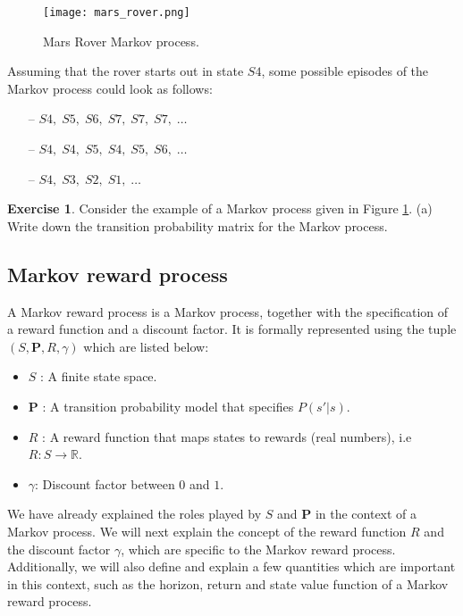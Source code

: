 \documentclass{article}
\theoremstyle{definition}
\newtheorem{exercise}{Exercise}[section]
\theoremstyle{remark}
\begin{document}
\begin{figure}[h]
    \centering
    \texttt{[image: mars\_rover.png]}
    \caption{Mars Rover Markov process.}
    \label{fig:MP}
\end{figure}

Assuming that the rover starts out in state $S4$, some possible episodes of the Markov process could look as follows:
\begin{itemize}
\item[--] $S4,\; S5,\; S6,\; S7,\; S7,\; S7,\; \dots$
\item[--] $S4,\; S4,\; S5,\; S4,\; S5,\; S6,\; \dots$
\item[--] $S4,\; S3,\; S2,\; S1,\; \dots$
\end{itemize}

\begin{exercise}
Consider the example of a Markov process given in Figure \ref{fig:MP}. (a) Write down the transition probability matrix for the Markov process.
\label{ex-MP-example}
\end{exercise}

\subsection{Markov reward process}
A Markov reward process is a Markov process, together with the specification of a reward function and a discount factor. It is formally represented using the tuple $(S,\mathbf{P},R,\gamma)$ which are listed below:
\begin{itemize}
\item $S$ : A finite state space.
\item $\mathbf{P}$ : A transition probability model that specifies $P(s'|s)$.
\item $R$ : A reward function that maps states to rewards (real numbers), i.e $R : S \rightarrow \mathbb{R}$.
\item $\gamma$: Discount factor between $0$ and $1$.
\end{itemize}

We have already explained the roles played by $S$ and $\mathbf{P}$ in the context of a Markov process. We will next explain the concept of the reward function $R$ and the discount factor $\gamma$, which are specific to the Markov reward process. Additionally, we will also define and explain a few quantities which are important in this context, such as the horizon, return and state value function of a Markov reward process.
\end{document}
